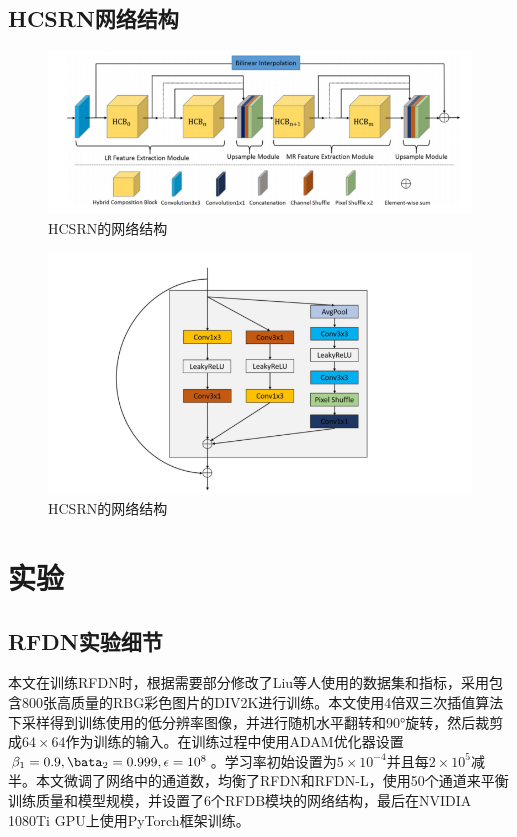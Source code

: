 \documentclass{cjc}
\begin{document}
\subsection{HCSRN网络结构}
\begin{figure}[htb]
  \centering
  \includegraphics[width=\linewidth]{image/hcsrn.png}
  \caption{HCSRN的网络结构}
\end{figure}


\begin{figure}[htb]
  \centering
  \includegraphics[width=\linewidth]{image/hcb.png}
  \caption{HCSRN的网络结构}
\end{figure}
\section{实验}
\subsection{RFDN实验细节}
本文在训练RFDN时，根据需要部分修改了Liu等人\cite{rfdn}使用的数据集和指标，采用包含800张高质量的RBG彩色图片的DIV2K\cite{div2k}进行训练。本文使用4倍双三次插值算法下采样得到训练使用的低分辨率图像，并进行随机水平翻转和90°旋转，然后裁剪成$64\times64$作为训练的输入。在训练过程中使用ADAM优化器\cite{adam}设置$\beta_1=0.9,\bata_2=0.999,\epsilon=10^8$。学习率初始设置为$5\times10^{-4}$并且每$2\times10^5$减半。本文微调了网络中的通道数，均衡了RFDN和RFDN-L，使用50个通道来平衡训练质量和模型规模，并设置了6个RFDB模块的网络结构，最后在NVIDIA 1080Ti GPU上使用PyTorch框架训练。
\end{document}
